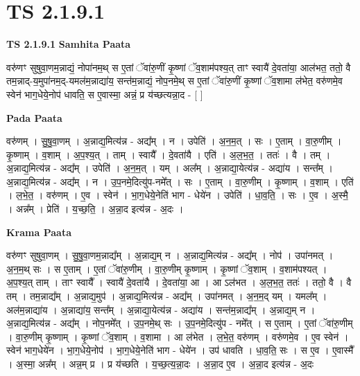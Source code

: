 \documentclass[17pt]{extarticle}
\begin{document}
\section*{ TS 2.1.9.1 }

\textbf{TS 2.1.9.1 } \newline
\textbf{Samhita Paata} \newline

वरु॑णꣳ सुषुवा॒णम॒न्नाद्यं॒ नोपा॑नम॒थ् स ए॒तां ॅवा॑रु॒णीं कृ॒ष्णां ॅव॒शाम॑पश्य॒त् ताꣳ स्वायै॑ दे॒वता॑या॒ आल॑भत॒ ततो॒ वै तम॒न्नाद्-य॒मुपा॑नम॒द्-यमल॑म॒न्नाद्या॑य॒ सन्त॑म॒न्नाद्यं॒ नोप॒नमे॒थ् स ए॒तां ॅवा॑रु॒णीं कृ॒ष्णां ॅव॒शामा ल॑भेत॒ वरु॑णमे॒व स्वेन॑ भाग॒धेये॒नोप॑ धावति॒ स ए॒वास्मा॒ अन्नं॒ प्र य॑च्छत्यन्ना॒द - [  ] \newline

\textbf{Pada Paata} \newline

वरु॑णम् । सु॒षु॒वा॒णम् । अ॒न्नाद्य॒मित्य॑न्न - अद्य᳚म् । न । उपेति॑ । अ॒न॒म॒त् । सः । ए॒ताम् । वा॒रु॒णीम् । कृ॒ष्णाम् । व॒शाम् । अ॒प॒श्य॒त् । ताम् । स्वायै᳚ । दे॒वता॑यै । एति॑ । अ॒ल॒भ॒त॒ । ततः॑ । वै । तम् । अ॒न्नाद्य॒मित्य॑न्न - अद्य᳚म् । उपेति॑ । अ॒न॒म॒त् । यम् । अल᳚म् । अ॒न्नाद्या॒येत्य॑न्न - अद्या॑य । सन्त᳚म् । अ॒न्नाद्य॒मित्य॑न्न - अद्य᳚म् । न । उ॒प॒नमे॒दित्यु॑प-नमे᳚त् । सः । ए॒ताम् । वा॒रु॒णीम् । कृ॒ष्णाम् । व॒शाम् । एति॑ । ल॒भे॒त॒ । वरु॑णम् । ए॒व । स्वेन॑ । भा॒ग॒धेये॒नेति॑ भाग - धेये॑न । उपेति॑ । धा॒व॒ति॒ । सः । ए॒व । अ॒स्मै॒ । अन्न᳚म् । प्रेति॑ । य॒च्छ॒ति॒ । अ॒न्ना॒द इत्य॑न्न - अ॒दः ।  \newline


\textbf{Krama Paata} \newline

वरु॑णꣳ सुषुवा॒णम् । सु॒षु॒वा॒णम॒न्नाद्य᳚म् । अ॒न्नाद्य॒म् न । अ॒न्नाद्य॒मित्य॑न्न - अद्य᳚म् । नोप॑ । उपा॑नमत् । अ॒न॒म॒थ् सः । स ए॒ताम् । ए॒तां ॅवा॑रु॒णीम् । वा॒रु॒णीम् कृ॒ष्णाम् । कृ॒ष्णां ॅव॒शाम् । व॒शाम॑पश्यत् । अ॒प॒श्य॒त् ताम् । ताꣳ स्वायै᳚ । स्वायै॑ दे॒वता॑यै । दे॒वता॑या॒ आ । आ ऽल॑भत । अ॒ल॒भ॒त॒ ततः॑ । ततो॒ वै । वै तम् । तम॒न्नाद्य᳚म् । अ॒न्नाद्य॒मुप॑ । अ॒न्नाद्य॒मित्य॑न्न - अद्य᳚म् । उपा॑नमत् । अ॒न॒म॒द् यम् । यमल᳚म् । अल॑म॒न्नाद्या॑य । अ॒न्नाद्या॑य॒ सन्त᳚म् । अ॒न्नाद्या॒येत्य॑न्न - अद्या॑य । सन्त॑म॒न्नाद्य᳚म् । अ॒न्नाद्य॒म् न । अ॒न्नाद्य॒मित्य॑न्न - अद्य᳚म् । नोप॒नमे᳚त् । उ॒प॒नमे॒थ् सः । उ॒प॒नमे॒दित्यु॑प - नमे᳚त् । स ए॒ताम् । ए॒तां ॅवा॑रु॒णीम् । वा॒रु॒णीम् कृ॒ष्णाम् । कृ॒ष्णां ॅव॒शाम् । व॒शामा । आ ल॑भेत । ल॒भे॒त॒ वरु॑णम् । वरु॑णमे॒व । ए॒व स्वेन॑ । स्वेन॑ भाग॒धेये॑न । भा॒ग॒धेये॒नोप॑ । भा॒ग॒धेये॒नेति॑ भाग - धेये॑न । उप॑ धावति । धा॒व॒ति॒ सः । स ए॒व । ए॒वास्मै᳚ । अ॒स्मा॒ अन्न᳚म् । अन्न॒म् प्र । प्र य॑च्छति । य॒च्छ॒त्य॒न्ना॒दः । अ॒न्ना॒द ए॒व । अ॒न्ना॒द इत्य॑न्न - अ॒दः \newline
\end{document}
